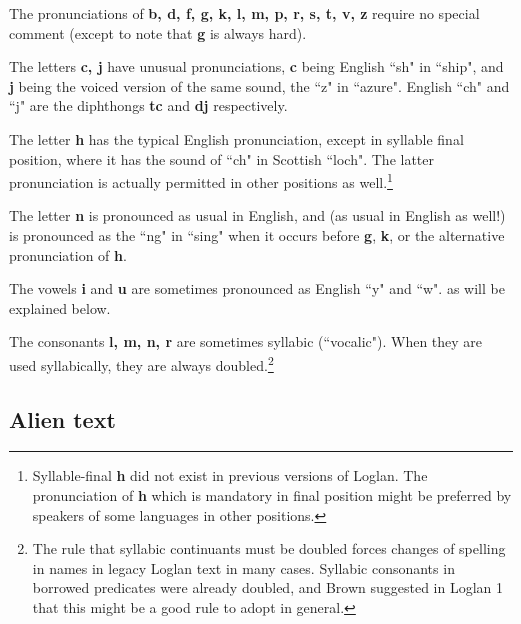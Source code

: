 \documentclass[12pt]{book}
\begin{document}
The pronunciations of {\bf b, d, f, g,  k, l, m,  p, r, s, t, v, z} require no special comment (except to note that {\bf g} is always hard).

The letters {\bf c, j} have unusual pronunciations, {\bf c} being English ``sh" in ``ship", and {\bf j} being the voiced version of the same sound, the ``z" in ``azure".  English
``ch" and ``j" are the diphthongs {\bf tc} and {\bf dj} respectively.

The letter {\bf h} has the typical English pronunciation, except in syllable final position, where it has the sound of ``ch" in Scottish ``loch".  The latter pronunciation is actually permitted in other positions as well.\footnote{Syllable-final {\bf h} did not exist in previous versions of Loglan.  The pronunciation of {\bf h} which is mandatory in final position might be preferred by speakers of some languages in other positions.}

The letter {\bf n} is pronounced as usual in English, and (as usual in English as well!) is pronounced as the ``ng" in ``sing" when it occurs before {\bf g}, {\bf k}, or the alternative pronunciation of {\bf h}.

The vowels {\bf i} and {\bf u} are sometimes pronounced as English ``y" and ``w". as will be explained below.

The consonants {\bf l, m, n, r} are sometimes syllabic (``vocalic").  When they are used syllabically, they are always doubled.\footnote{The rule that syllabic continuants must be doubled forces changes of spelling in names in legacy Loglan text in many cases.  Syllabic consonants in borrowed predicates were already doubled, and Brown suggested in Loglan 1 that this might be a good rule to adopt in general.}

\subsection{Alien text}
\end{document}
